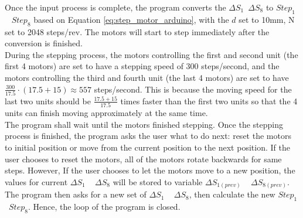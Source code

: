 \begin{itemize}
    Once the input process is complete, the program converts the $\Delta S_1$~$\Delta S_8$ to $Step_1$ ~ $Step_8$ 
    based on Equation \ref{eq:step_motor_arduino}, with the $d$ set to 10mm, N set to 2048 steps/rev. The motors 
    will start to step immediately after the conversion is finished. \\
    During the stepping process, the motors controlling the first and second unit (the first 4 motors) are set 
    to have a stepping speed of 300 steps/second, and the motors controlling the third and fourth unit 
    (the last 4 motors) are set to have $\frac{300}{17.5}\cdot(17.5+15)\approx 557$ steps/second. This is because 
    the moving speed for the last two units should be $\frac{17.5+15}{17.5}$ times faster than the first two units 
    so that the 4 units can finish moving approximately at the same time. \\
    The program shall wait until the motors finished stepping. Once the stepping process is finished, the program 
    asks the user what to do next: reset the motors to initial position or move from the current position to the 
    next position. If the user chooses to reset the motors, all of the motors rotate backwards for same steps. 
    However, If the user chooses to let the motors move to a new position, the values for current $\Delta S_1$ ~ 
    $\Delta S_8$ will be stored to variable $\Delta S_{1(prev)}$ ~ $\Delta S_{8(prev)}$. The program then asks for 
    a new set of $\Delta S_1$ ~ $\Delta S_8$, then calculate the new $Step_1$ ~$Step_8$. Hence, the loop of the 
    program is closed.
\end{itemize}

